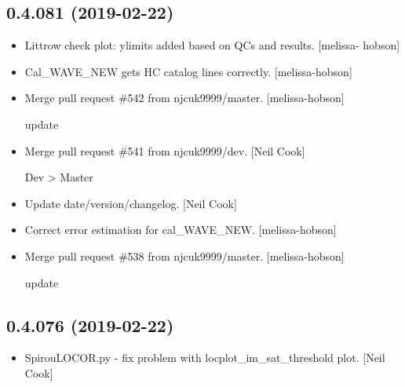 \documentclass[a4paper,10pt,english]{report}
\begin{document}
\subsection{0.4.081 (2019-02-22)}
\label{\detokenize{misc/changelog:id177}}\begin{itemize}
\item {} 
Littrow check plot: ylimits added based on QCs and results. {[}melissa-
hobson{]}

\item {} 
Cal\_WAVE\_NEW gets HC catalog lines correctly. {[}melissa-hobson{]}

\item {} 
Merge pull request \#542 from njcuk9999/master. {[}melissa-hobson{]}

update

\item {} 
Merge pull request \#541 from njcuk9999/dev. {[}Neil Cook{]}

Dev \textendash{}\textgreater{} Master

\item {} 
Update date/version/changelog. {[}Neil Cook{]}

\item {} 
Correct error estimation for cal\_WAVE\_NEW. {[}melissa-hobson{]}

\item {} 
Merge pull request \#538 from njcuk9999/master. {[}melissa-hobson{]}

update

\end{itemize}


\subsection{0.4.076 (2019-02-22)}
\label{\detokenize{misc/changelog:id178}}\begin{itemize}
\item {} 
SpirouLOCOR.py - fix problem with locplot\_im\_sat\_threshold plot. {[}Neil
Cook{]}

\end{itemize}
\end{document}
